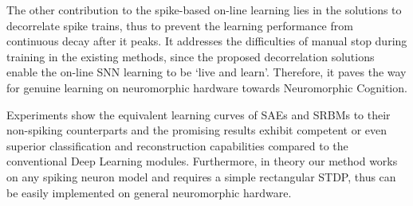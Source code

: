 The other contribution to the spike-based on-line learning lies in the solutions to decorrelate spike trains, thus to prevent the learning performance from continuous decay after it peaks.
It addresses the difficulties of manual stop during training in the existing methods, since the proposed decorrelation solutions enable the on-line SNN learning to be `live and learn'.
Therefore, it paves the way for genuine learning on neuromorphic hardware towards Neuromorphic Cognition.

Experiments show the equivalent learning curves of SAEs and SRBMs to their non-spiking counterparts and the promising results exhibit competent or even superior classification and reconstruction capabilities compared to the conventional Deep Learning modules.
Furthermore, in theory our method works on any spiking neuron model and requires a simple rectangular STDP, thus can be easily implemented on general neuromorphic hardware.
